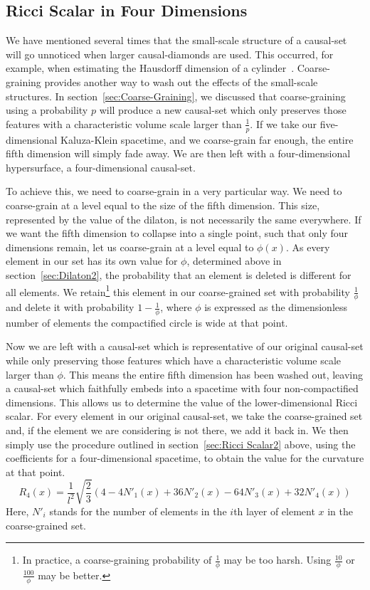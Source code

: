 \documentclass[a4paper,12pt]{article}
\numberwithin{equation}{section}
\begin{document}
\subsection{Ricci Scalar in Four Dimensions}
\label{sec:Ricci Scalar in Four Dimensions}

We have mentioned several times that the small-scale structure of a causal-set will go unnoticed when larger causal-diamonds are used. This occurred, for example, when estimating the Hausdorff dimension of a cylinder~\cite{Meyer1988}. Coarse-graining provides another way to wash out the effects of the small-scale structures. In section~\ref{sec:Coarse-Graining}, we discussed that coarse-graining using a probability $p$ will produce a new causal-set which only preserves those features with a characteristic volume scale larger than $\frac{1}{p}$. If we take our five-dimensional Kaluza-Klein spacetime, and we coarse-grain far enough, the entire fifth dimension will simply fade away. We are then left with a four-dimensional hypersurface, a four-dimensional causal-set.

To achieve this, we need to coarse-grain in a very particular way. We need to coarse-grain at a level equal to the size of the fifth dimension. This size, represented by the value of the dilaton, is not necessarily the same everywhere. If we want the fifth dimension to collapse into a single point, such that only four dimensions remain, let us coarse-grain at a level equal to $\phi(x)$. As every element in our set has its own value for $\phi$, determined above in section~\ref{sec:Dilaton2}, the probability that an element is deleted is different for all elements. We retain\footnote{In practice, a coarse-graining probability of $\frac{1}{\phi}$ may be too harsh. Using $\frac{10}{\phi}$ or $\frac{100}{\phi}$ may be better.} this element in our coarse-grained set with probability $\frac{1}{\phi}$ and delete it with probability $1-\frac{1}{\phi}$, where $\phi$ is expressed as the dimensionless number of elements the compactified circle is wide at that point.

Now we are left with a causal-set which is representative of our original causal-set while only preserving those features which have a characteristic volume scale larger than $\phi$. This means the entire fifth dimension has been washed out, leaving a causal-set which faithfully embeds into a spacetime with four non-compactified dimensions. This allows us to determine the value of the lower-dimensional Ricci scalar. For every element in our original causal-set, we take the coarse-grained set and, if the element we are considering is not there, we add it back in. We then simply use the procedure outlined in section~\ref{sec:Ricci Scalar2} above, using the coefficients for a four-dimensional spacetime, to obtain the value for the curvature at that point.
\begin{equation}
\label{eq:Ricci scalar in four dimensions}
R_4 (x)=\frac{1}{l^2}\sqrt{\frac{2}{3}} \left(4-4 N'_1(x)+36 N'_2(x)-64 N'_3(x)+32 N'_4(x) \right)
\end{equation}
Here, $N'_i$ stands for the number of elements in the $i$th layer of element $x$ in the coarse-grained set.
\end{document}
